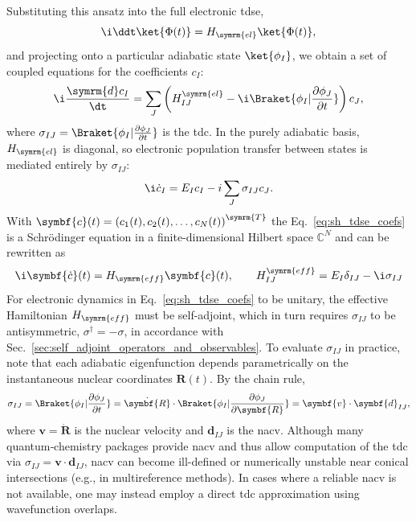 Substituting this ansatz into the full electronic \acrshort{tdse},
\begin{equation}
\i\ddt\ket{\Phi(t)}=H_{\symrm{el}}\ket{\Phi(t)},
\end{equation}
and projecting onto a particular adiabatic state $\ket{\phi_I}$, we obtain a set of coupled equations for the coefficients $c_I$:
\begin{equation}\label{eq:tsh_eom}
\i\frac{\symrm{d}c_I}{\dt}=\sum_J\left(H_{IJ}^{\symrm{el}}-\i\Braket{\phi_I\vert\frac{\partial\phi_J}{\partial t}}\right)c_J,
\end{equation}
where $\sigma_{IJ}=\Braket{\phi_I\vert\frac{\partial\phi_J}{\partial t}}$ is the \acrfull{tdc}. In the purely adiabatic basis, $H_{\symrm{el}}$ is diagonal, so electronic population transfer between states is mediated entirely by $\sigma_{IJ}$:
\begin{equation}\label{eq:sh_tdse_coefs}
\i\dot c_I=E_I c_I-i\sum_J\sigma_{IJ}c_J.
\end{equation}
With $\symbf{c}(t)=\left(c_1(t),c_2(t),\dots,c_N(t)\right)^{\symrm{T}}$ the Eq.~\eqref{eq:sh_tdse_coefs} is a Schr\"odinger equation in a finite-dimensional Hilbert space $\mathbb{C}^N$ and can be rewritten as
\begin{equation}
\i\symbf{\dot{c}}(t)=H_{\symrm{eff}}\symbf{c}(t),\qquad H_{IJ}^{\symrm{eff}}=E_I\delta_{IJ}-\i\sigma_{IJ}
\end{equation}
For electronic dynamics in Eq.~\eqref{eq:sh_tdse_coefs} to be unitary, the effective Hamiltonian $H_{\symrm{eff}}$ must be self-adjoint, which in turn requires $\sigma_{IJ}$ to be antisymmetric, $\sigma^\dagger=-\sigma$, in accordance with Sec.~\ref{sec:self_adjoint_operators_and_observables}. To evaluate $\sigma_{IJ}$ in practice, note that each adiabatic eigenfunction depends parametrically on the instantaneous nuclear coordinates $\symbf{R}(t)$. By the chain rule,
\begin{equation}\label{eq:tdc_nacv}
\sigma_{IJ}=\Braket{\phi_I\vert\frac{\partial\phi_J}{\partial t}}=\dot{\symbf{R}}\cdot\Braket{\phi_I\vert\frac{\partial\phi_J}{\partial\symbf{R}}}=\symbf{v}\cdot\symbf{d}_{IJ},
\end{equation}
where $\symbf{v}=\dot{\symbf{R}}$ is the nuclear velocity and $\symbf{d}_{IJ}$ is the \acrfull{nacv}. Although many quantum‐chemistry packages provide \acrshort{nacv} and thus allow computation of the \acrshort{tdc} via $\sigma_{IJ}=\symbf{v}\cdot\symbf{d}_{IJ}$, \acrshort{nacv} can become ill-defined or numerically unstable near conical intersections (e.g., in multireference methods). In cases where a reliable \acrshort{nacv} is not available, one may instead employ a direct \acrshort{tdc} approximation using wavefunction overlaps.
